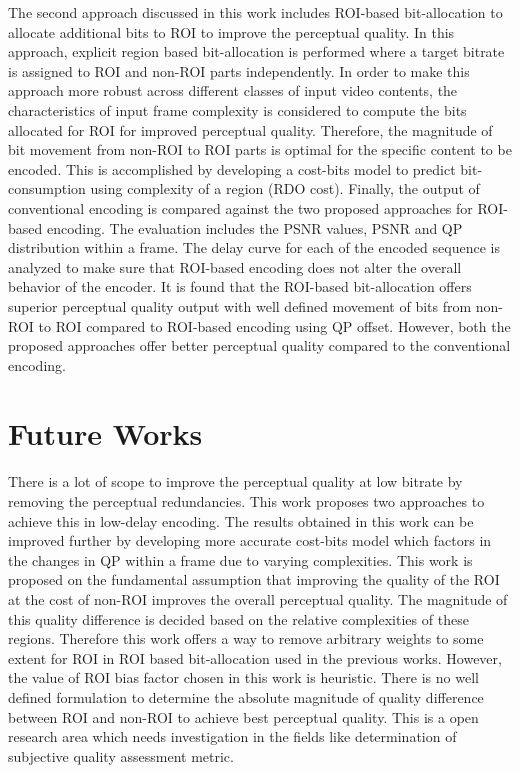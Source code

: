 The second approach discussed in this work includes ROI-based bit-allocation to allocate additional bits to ROI to improve the perceptual quality. In this approach, explicit region based bit-allocation is performed where a target bitrate is assigned to ROI and non-ROI parts independently. In order to make this approach more robust across different classes of input video contents, the characteristics of input frame complexity is considered to compute the bits allocated for ROI for improved perceptual quality. Therefore, the magnitude of bit movement from non-ROI to ROI parts is optimal for the specific content to be encoded. This is accomplished by developing a cost-bits model to predict bit-consumption using complexity of a region (RDO cost). Finally, the output of conventional encoding is compared against the two proposed approaches for ROI-based encoding. The evaluation includes the PSNR values, PSNR and QP distribution within a frame. The delay curve for each of the encoded sequence is analyzed to make sure that ROI-based encoding does not alter the overall behavior of the encoder. It is found that the ROI-based bit-allocation offers superior perceptual quality output with well defined movement of bits from non-ROI to ROI compared to ROI-based encoding using QP offset. However, both the proposed approaches offer better perceptual quality compared to the conventional encoding.

\section{Future Works}
There is a lot of scope to improve the perceptual quality at low bitrate by removing the perceptual redundancies. This work proposes two approaches to achieve this in low-delay encoding. The results obtained in this work can be improved further by developing more accurate cost-bits model which factors in the changes in QP within a frame due to varying complexities. This work is proposed on the fundamental assumption that improving the quality of the ROI at the cost of non-ROI improves the overall perceptual quality. The magnitude of this quality difference is decided based on the relative complexities of these regions. Therefore this work offers a way to remove arbitrary weights to some extent for ROI in ROI based bit-allocation used in the previous works. However, the value of ROI bias factor chosen in this work is heuristic. There is no well defined formulation to determine the absolute magnitude of quality difference between ROI and non-ROI to achieve best perceptual quality. This is a open research area which needs investigation in the fields like determination of subjective quality assessment metric.